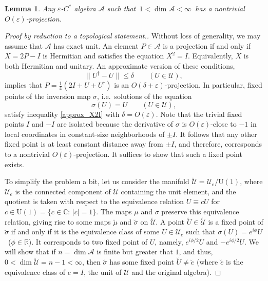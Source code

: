 \documentclass[12pt]{article}
\newcommand{\RR}{\mathbb{R}}
\newcommand{\CC}{\mathbb{C}}
\newcommand{\calA}{\mathcal{A}}
\newcommand{\calU}{\mathcal{U}}
\newcommand{\UU}{\mathrm{U}}
\newcommand{\eps}{\varepsilon}
\renewcommand{\le}{\leqslant}
\newtheorem{Lemma}[Theorem]{Lemma}
\newtheorem[definition]{Definition}[Theorem]{Definition}
\newtheorem[remark]{Example}[Theorem]{Example}
\newtheorem[remark]{Remark}[Theorem]{Remark}
\newtheorem[remark]{Question}[Theorem]{Open question}
\newtheorem*[definition]{definition}{Definition}
\newtheorem*[remark]{example}{Example}
\newtheorem*[remark]{remark}{Remark}
\newtheorem*[remark]{question}{Open question}
\numberwithin{equation}{section}
\begin{document}
\begin{Lemma}\label{lem_nontriv_projection} Any $\eps$-$C^*$ algebra $\calA$ such that\, $1<\dim\calA<\infty$\, has a nontrivial $O(\eps)$-projection.
\end{Lemma}

\begin{proof}[Proof by reduction to a topological statement.]
Without loss of generality, we may assume that $\calA$ has exact unit. An element $P\in\calA$ is a projection if and only if $X=2P-I$ is Hermitian and satisfies the equation $X^2=I$. Equivalently, $X$ is both Hermitian and unitary. An approximate version of these conditions,
\begin{equation}\label{approx_X2I}
\|U^\dag-U\|\le\delta\qquad (U\in\calU),
\end{equation}
implies that $P=\frac{1}{4}(2I+U+U^\dag)$ is an $O(\delta+\eps)$-projection. In particular, fixed points of the inversion map $\sigma$, i.e.\ solutions of the equation
\begin{equation}\label{X2I}
\sigma(U)=U\qquad (U\in\calU),
\end{equation}
satisfy inequality \eqref{approx_X2I} with $\delta=O(\eps)$. Note that the trivial fixed points $I$ and $-I$ are isolated because the derivative of $\sigma$ is $O(\eps)$-close to $-1$ in local coordinates in constant-size neighborhoods of $\pm I$. It follows that any other fixed point is at least constant distance away from $\pm I$, and therefore, corresponds to a nontrivial $O(\eps)$-projection. It suffices to show that such a fixed point exists.

To simplify the problem a bit, let us consider the manifold $\breve{\calU}=\calU_e/\UU(1)$, where $\calU_e$ is the connected component of $\calU$ containing the unit element, and the quotient is taken with respect to the equivalence relation $U\equiv cU$ for $c\in\UU(1)=\{c\in\CC:\,|c|=1\}$. The maps $\mu$ and $\sigma$ preserve this equivalence relation, giving rise to some maps $\breve{\mu}$ and $\breve{\sigma}$ on $\breve{\calU}$. A point $\breve{U}\in\breve{\calU}$ is a fixed point of $\breve{\sigma}$ if and only if it is the equivalence class of some $U\in\calU_e$ such that $\sigma(U)=e^{i\phi}U$\, ($\phi\in\RR$). It corresponds to two fixed point of $U$, namely, $e^{i\phi/2}U$ and $-e^{i\phi/2}U$. We will show that if $n=\dim\calA$ is finite but greater that $1$, and thus, $0<\dim\breve{\calU}=n-1<\infty$, then $\breve{\sigma}$ has some fixed point $\breve{U}\not=\breve{e}$ (where $\breve{e}$ is the equivalence class of $e=I$, the unit of $\calU$ and the original algebra).\medskip


\end{proof}
\end{document}
